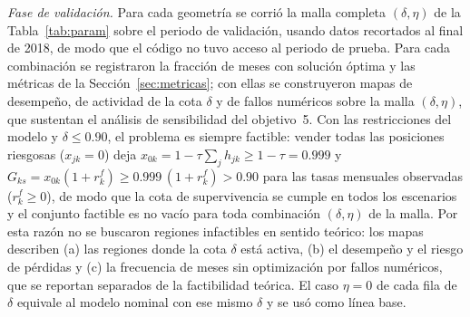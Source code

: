 \emph{Fase de validación.} Para cada geometría se corrió la malla completa $(\delta,\eta)$ de la Tabla~\ref{tab:param} sobre el periodo de validación, usando datos recortados al final de 2018, de modo que el código no tuvo acceso al periodo de prueba. 
Para cada combinación se registraron la fracción de meses con solución óptima y las métricas de la Sección~\ref{sec:metricas}; con ellas se construyeron mapas de desempeño, de actividad de la cota $\delta$ y de fallos numéricos sobre la malla $(\delta,\eta)$, que sustentan el análisis de sensibilidad del objetivo~5. Con las restricciones del modelo y $\delta\le0.90$, el problema es siempre factible: vender todas las posiciones riesgosas ($x_{jk}=0$) deja $x_{0k}=1-\tau\sum_{j}h_{jk}\ge1-\tau=0.999$ y $G_{ks}=x_{0k}(1+r^f_k)\ge0.999\,(1+r^f_k)>0.90$ para las tasas mensuales observadas ($r^f_k\ge0$), de modo que la cota de supervivencia se cumple en todos los escenarios y el conjunto factible es no vacío para toda combinación $(\delta,\eta)$ de la malla. Por esta razón no se buscaron regiones infactibles en sentido teórico: los mapas describen (a) las regiones donde la cota $\delta$ está activa, (b) el desempeño y el riesgo de pérdidas y (c) la frecuencia de meses sin optimización por fallos numéricos, que se reportan separados de la factibilidad teórica.
 El caso $\eta=0$ de cada fila de $\delta$ equivale al modelo nominal con ese mismo $\delta$ y se usó como línea base.


